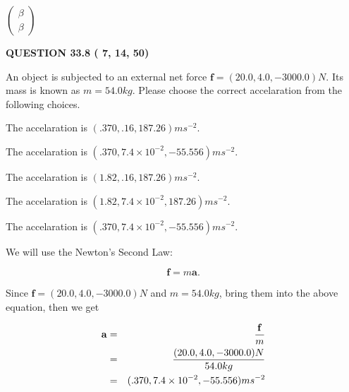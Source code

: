 \documentclass[12pt]{article}
\begin{document}
   
 $  \left( \begin{array}
 {
 c
 }
 \beta \\ 
 \beta
 \end{array} \right) $ 
  
\vspace{0.2in}
  
{\textbf{\Large{QUESTION
33.8 
 (          7,         14,         50)
}}}
  
  
 
An object is subjected to an external net force $\mathbf{f}=
(20.0 , 4.0 , -3000.0) N$.
Its mass is known as $m= %
54.0 kg$.
Please choose the correct accelaration from the following choices.
 
 
  The accelaration is $  %
(
.370,
.16,
187.26)
ms^{-2} $.
 
 
  The accelaration is $  %
(
.370,
7.4 \times 10^{-2},
-55.556)
ms^{-2} $.
 
 
  The accelaration is $  %
(
1.82,
.16,
187.26)
ms^{-2} $.
 
 
  The accelaration is $  %
(
1.82,
7.4 \times 10^{-2},
187.26)
ms^{-2} $.
 
 
\noindent{}
 
 
  The accelaration is $  %
(
.370,
7.4 \times 10^{-2},
-55.556)
ms^{-2} $.
 
 
\noindent{}
 
 
 
 
 
\noindent{}
 
 

We will use the Newton's Second Law:
 
\[
\mathbf{f}=m\mathbf{a}.
\]
 
Since $\mathbf{f}= %
(20.0 , 4.0 , -3000.0) N$
and $m= %
54.0kg$, bring them into the above equation, then we get
 
\begin{eqnarray*}
\mathbf{a}&=&\frac{\mathbf{f}}m  \\
&=&\frac{ %
(20.0 , 4.0 , -3000.0) N}{ %
54.0kg}  \\
&=& %
(.370 , 7.4 \times 10^{-2} , -55.556) ms^{-2}
\end{eqnarray*}
 
\end{document}

